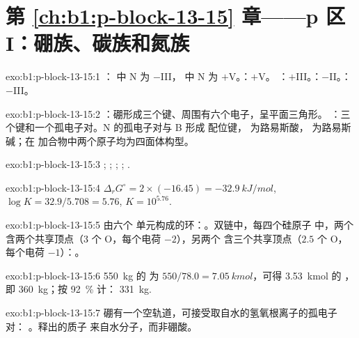 \section*{第 \ref{ch:b1:p-block-13-15} 章——p 区 I：硼族、碳族和氮族}

\begin{solution}{exo:b1:p-block-13-15:1}
： 中 N 为 $-$III， 中 N 为 $+$V。：$+$V。
：$+$III。：$-$II。：$-$III。
\end{solution}

\begin{solution}{exo:b1:p-block-13-15:2}
：硼形成三个键、周围有六个电子，呈平面三角形。
：三个键和一个孤电子对。N 的孤电子对与 B 形成
配位键， 为路易斯酸， 为路易斯碱；在
加合物中两个原子均为四面体构型。
\end{solution}

\begin{solution}{exo:b1:p-block-13-15:3}
; ;
; ;
.
\end{solution}

\begin{solution}{exo:b1:p-block-13-15:4}
$\Delta_r G^\circ = 2 \times (-16.45) = \qty{-32.9}{kJ/mol}$, $\log K =
32.9/5.708 = 5.76$, $K = 10^{5.76}$.
\end{solution}

\begin{solution}{exo:b1:p-block-13-15:5}
由六个  单元构成的环：。双链中，每四个硅原子
中，两个含两个共享顶点（3 个 O，每个电荷 $-2$），另两个
含三个共享顶点（$2.5$ 个 O，每个电荷 $-1$）：。
\end{solution}

\begin{solution}{exo:b1:p-block-13-15:6}
\qty{550}{kg} 的  为 $550/78.0 = \qty{7.05}{kmol}$，可得
\qty{3.53}{kmol} 的 ，即 \qty{360}{kg}；按 \qty{92}{\percent} 计：
\qty{331}{kg}.
\end{solution}

\begin{solution}{exo:b1:p-block-13-15:7}
硼有一个空轨道，可接受取自水的氢氧根离子的孤电子对：
。释出的质子
来自水分子，而非硼酸。
\end{solution}

